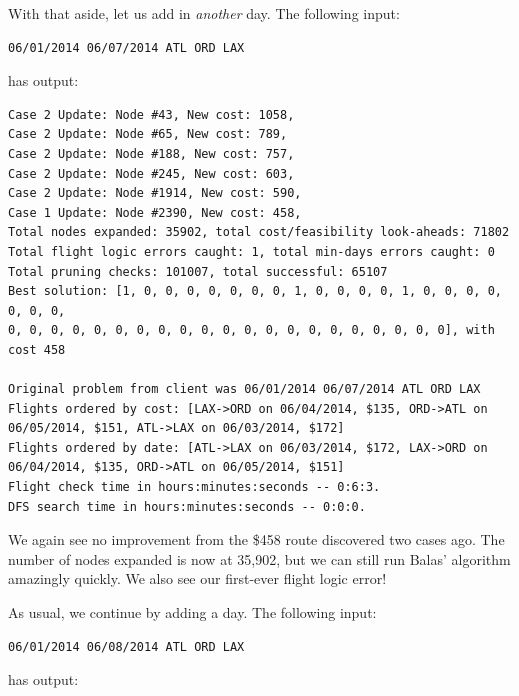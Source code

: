\documentclass{article}
\begin{document}
With that aside, let us add in \emph{another} day. The following input:

\begin{verbatim}
06/01/2014 06/07/2014 ATL ORD LAX
\end{verbatim}

has output:

\scriptsize
\begin{verbatim}
Case 2 Update: Node #43, New cost: 1058, 
Case 2 Update: Node #65, New cost: 789, 
Case 2 Update: Node #188, New cost: 757, 
Case 2 Update: Node #245, New cost: 603, 
Case 2 Update: Node #1914, New cost: 590, 
Case 1 Update: Node #2390, New cost: 458, 
Total nodes expanded: 35902, total cost/feasibility look-aheads: 71802
Total flight logic errors caught: 1, total min-days errors caught: 0
Total pruning checks: 101007, total successful: 65107
Best solution: [1, 0, 0, 0, 0, 0, 0, 0, 1, 0, 0, 0, 0, 1, 0, 0, 0, 0, 0, 0, 0, 
0, 0, 0, 0, 0, 0, 0, 0, 0, 0, 0, 0, 0, 0, 0, 0, 0, 0, 0, 0, 0], with cost 458

Original problem from client was 06/01/2014 06/07/2014 ATL ORD LAX
Flights ordered by cost: [LAX->ORD on 06/04/2014, $135, ORD->ATL on 06/05/2014, $151, ATL->LAX on 06/03/2014, $172]
Flights ordered by date: [ATL->LAX on 06/03/2014, $172, LAX->ORD on 06/04/2014, $135, ORD->ATL on 06/05/2014, $151]
Flight check time in hours:minutes:seconds -- 0:6:3.
DFS search time in hours:minutes:seconds -- 0:0:0.
\end{verbatim}
\normalsize

We again see no improvement from the \$458 route discovered two cases ago. The number of nodes expanded is now at 35,902, but we can still run Balas'
algorithm amazingly quickly. We also see our first-ever flight logic error!

As usual, we continue by adding a day. The following input:

\begin{verbatim}
06/01/2014 06/08/2014 ATL ORD LAX
\end{verbatim}

has output:
\end{document}
